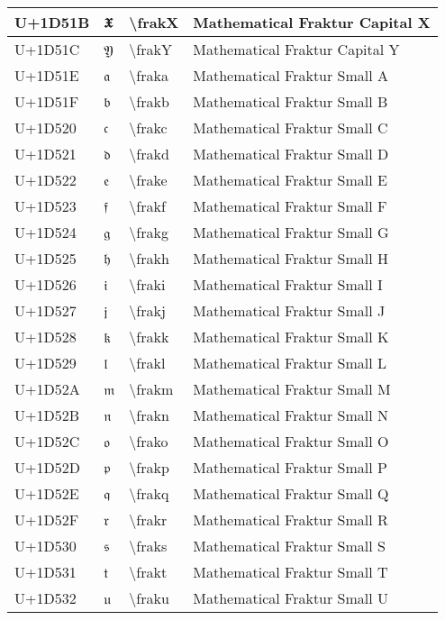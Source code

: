 \begin{table}[h]
\begin{tabulary}{\linewidth}{|L|L|L|L|}
\hline
U+1D51B & 𝔛 & {\textbackslash}frakX & Mathematical Fraktur Capital X \\
\hline
U+1D51C & 𝔜 & {\textbackslash}frakY & Mathematical Fraktur Capital Y \\
\hline
U+1D51E & 𝔞 & {\textbackslash}fraka & Mathematical Fraktur Small A \\
\hline
U+1D51F & 𝔟 & {\textbackslash}frakb & Mathematical Fraktur Small B \\
\hline
U+1D520 & 𝔠 & {\textbackslash}frakc & Mathematical Fraktur Small C \\
\hline
U+1D521 & 𝔡 & {\textbackslash}frakd & Mathematical Fraktur Small D \\
\hline
U+1D522 & 𝔢 & {\textbackslash}frake & Mathematical Fraktur Small E \\
\hline
U+1D523 & 𝔣 & {\textbackslash}frakf & Mathematical Fraktur Small F \\
\hline
U+1D524 & 𝔤 & {\textbackslash}frakg & Mathematical Fraktur Small G \\
\hline
U+1D525 & 𝔥 & {\textbackslash}frakh & Mathematical Fraktur Small H \\
\hline
U+1D526 & 𝔦 & {\textbackslash}fraki & Mathematical Fraktur Small I \\
\hline
U+1D527 & 𝔧 & {\textbackslash}frakj & Mathematical Fraktur Small J \\
\hline
U+1D528 & 𝔨 & {\textbackslash}frakk & Mathematical Fraktur Small K \\
\hline
U+1D529 & 𝔩 & {\textbackslash}frakl & Mathematical Fraktur Small L \\
\hline
U+1D52A & 𝔪 & {\textbackslash}frakm & Mathematical Fraktur Small M \\
\hline
U+1D52B & 𝔫 & {\textbackslash}frakn & Mathematical Fraktur Small N \\
\hline
U+1D52C & 𝔬 & {\textbackslash}frako & Mathematical Fraktur Small O \\
\hline
U+1D52D & 𝔭 & {\textbackslash}frakp & Mathematical Fraktur Small P \\
\hline
U+1D52E & 𝔮 & {\textbackslash}frakq & Mathematical Fraktur Small Q \\
\hline
U+1D52F & 𝔯 & {\textbackslash}frakr & Mathematical Fraktur Small R \\
\hline
U+1D530 & 𝔰 & {\textbackslash}fraks & Mathematical Fraktur Small S \\
\hline
U+1D531 & 𝔱 & {\textbackslash}frakt & Mathematical Fraktur Small T \\
\hline
U+1D532 & 𝔲 & {\textbackslash}fraku & Mathematical Fraktur Small U \\

\end{tabulary}
\end{table}
